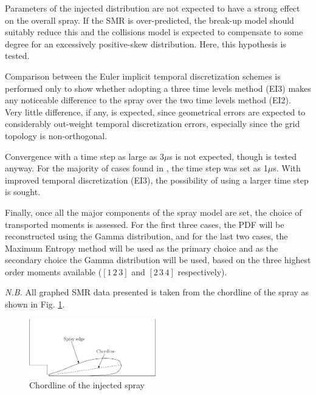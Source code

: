 \documentclass[a4paper,10pt]{article}
\begin{document}
Parameters of the injected distribution are not expected to have a strong effect on the overall spray. If the SMR is over-predicted, the break-up model should suitably reduce this and the collisions model is expected to compensate to some degree for an excessively positive-skew distribution. Here, this hypothesis is tested.

Comparison between the Euler implicit temporal discretization schemes is performed only to show whether adopting a three time levels method (EI3) makes any noticeable difference to the spray over the two time levels method (EI2). Very little difference, if any, is expected, since geometrical errors are expected to considerably out-weight temporal discretization errors, especially since the grid topology is non-orthogonal.

Convergence with a time step as large as 3$\mu$s is not expected, though is tested anyway. For the majority of cases found in \cite{beck2000}, the time step was set as 1$\mu$s. With improved temporal discretization (EI3), the possibility of using a larger time step is sought.

Finally, once all the major components of the spray model are set, the choice of transported moments is assessed. For the first three cases, the PDF will be reconstructed using the Gamma distribution, and for the last two cases, the Maximum Entropy method will be used as the primary choice and as the secondary choice the Gamma distribution will be used, based on the three highest order moments available ($[1\,2\,3]$ and $[2\,3\,4]$ respectively).

\textit{N.B.} All graphed SMR data presented is taken from the chordline of the spray as shown in Fig. \ref{fig:chord}.
\begin{figure}[H]
\centering
\includegraphics[width=0.49\textwidth]{chord.eps}
\caption{Chordline of the injected spray}
\label{fig:chord}
\end{figure}
\end{document}
